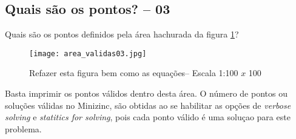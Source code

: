 \subsection{Quais são os pontos? -- 03}

Quais são os pontos definidos  pela área hachurada da figura \ref{fig_area_validas03}?
 \begin{figure}[!hb]
  \centering
      \texttt{[image: area\_validas03.jpg]}
      \caption{Refazer esta figura bem como as equações-- Escala 1:100 $x$ 100}
\label{fig_area_validas03}
\end{figure}


Basta imprimir os pontos válidos dentro desta área. O número de pontos ou soluções válidas
no Minizinc, são obtidas ao se habilitar as opções de \textit{verbose solving} e \textit{statitics for solving}, pois cada ponto válido é uma soluçao para este problema.

